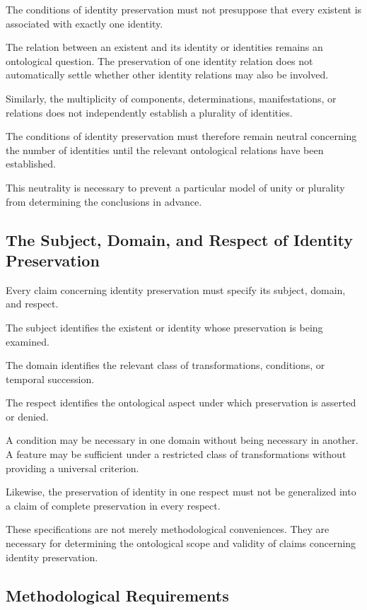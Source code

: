 The conditions of identity preservation must
not presuppose that every existent is associated
with exactly one identity.

The relation between an existent and its identity
or identities remains an ontological question.
The preservation of one identity relation does
not automatically settle whether other identity
relations may also be involved.

Similarly, the multiplicity of components,
determinations, manifestations, or relations
does not independently establish a plurality
of identities.

The conditions of identity preservation must
therefore remain neutral concerning the number
of identities until the relevant ontological
relations have been established.

This neutrality is necessary to prevent a
particular model of unity or plurality from
determining the conclusions in advance.

\subsection{The Subject, Domain, and Respect of Identity Preservation}

Every claim concerning identity preservation
must specify its subject, domain, and respect.

The subject identifies the existent or identity
whose preservation is being examined.

The domain identifies the relevant class of
transformations, conditions, or temporal
succession.

The respect identifies the ontological aspect
under which preservation is asserted or denied.

A condition may be necessary in one domain
without being necessary in another. A feature
may be sufficient under a restricted class
of transformations without providing a universal
criterion.

Likewise, the preservation of identity in one
respect must not be generalized into a claim
of complete preservation in every respect.

These specifications are not merely methodological
conveniences. They are necessary for determining
the ontological scope and validity of claims
concerning identity preservation.

\subsection{Methodological Requirements}

